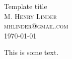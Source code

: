 \documentclass{article}
\begin{document}
{
    \centering
    \large Template title \\[.5em]
    \small\scshape M. Henry Linder \\
    \footnotesize mhlinder@gmail.com \\[.5em]
    \small \today
    \par
}

% 

This is some text.
\end{document}
